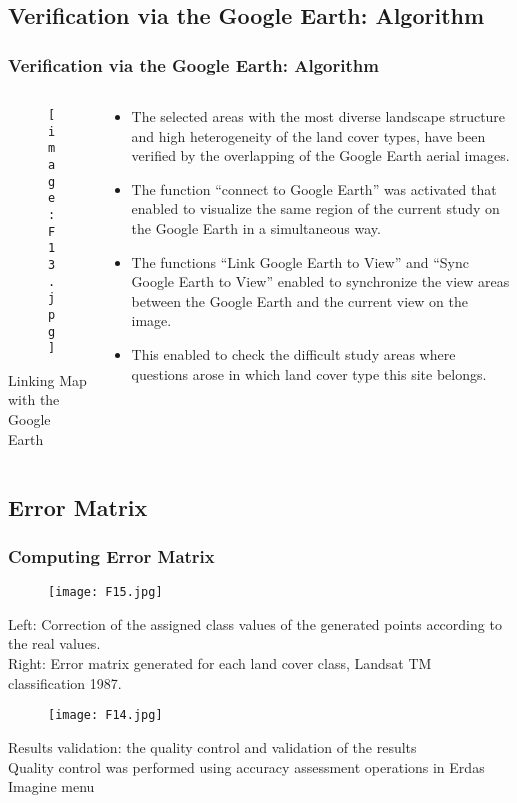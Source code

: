 \documentclass[pdflatex,compress,8pt,
	xcolor={dvipsnames,dvipsnames,svgnames,x11names,table},
	hyperref={colorlinks = true,
	breaklinks = true, 
	urlcolor = NavyBlue, 
	breaklinks = true}]{beamer}
\begin{document}
\subsection{Verification via the Google Earth: Algorithm}
\begin{frame}\frametitle{Verification via the Google Earth: Algorithm}
\begin{minipage}[0.4\textheight]{\textwidth}
\begin{columns}[T]
\begin{column}{0.5\textwidth}
\begin{figure}[H]
	\centering
		\texttt{[image: F13.jpg]}
\end{figure}
\small{Linking Map with the Google Earth}
\end{column}
\begin{column}{0.5\textwidth}
\begin{itemize}
	\item The selected areas with the most diverse landscape structure and high heterogeneity of the land cover types, have been verified by the overlapping of the Google Earth aerial images.
	\item The function “connect to Google Earth” was activated that enabled to visualize the same region of the current study on the Google Earth in a simultaneous way.
	\item The functions “Link Google Earth to View” and “Sync Google Earth to View” enabled to synchronize the view areas between the Google Earth and the current view on the image.
	\item This enabled to check the difficult study areas where questions arose in which land cover type this site belongs.
\end{itemize}
\end{column}
\end{columns}
\end{minipage}
\end{frame}

\subsection{Error Matrix}
\begin{frame}\frametitle{Computing Error Matrix}
\begin{figure}[H]
	\centering
		\texttt{[image: F15.jpg]}
\end{figure}
\small{Left: Correction of the assigned class values of the generated points according to the real values. \\
Right: Error matrix generated for each land cover class, Landsat TM classification 1987.}
\begin{figure}[H]
	\centering
		\texttt{[image: F14.jpg]}
\end{figure}
\small{Results validation: the quality control and validation of the results\\
 Quality control was performed using accuracy assessment operations in Erdas Imagine menu}
\end{frame}
\end{document}
